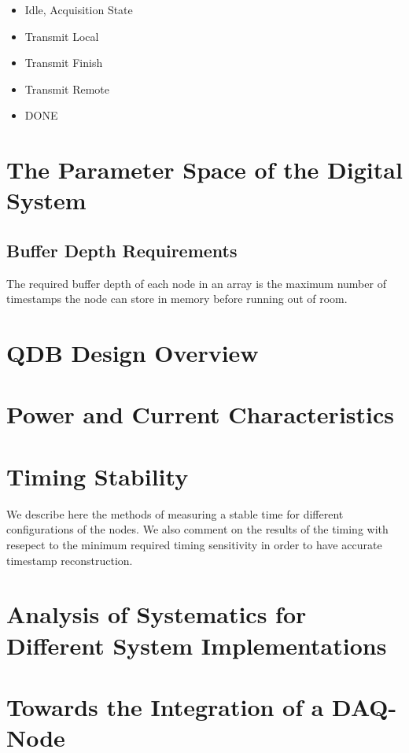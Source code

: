 \begin{itemize}
    \item Idle, Acquisition State
    \item Transmit Local
    \item Transmit Finish
    \item Transmit Remote
    \item DONE
\end{itemize}
\label{fsm_state_labels}

\section{The Parameter Space of the Digital System}


\subsection{Buffer Depth Requirements}

The required buffer depth of each node in an array is the maximum number of timestamps the node can store in memory before running out of room.

\section{QDB Design Overview}


\section{Power and Current Characteristics}



\section{Timing Stability}

We describe here the methods of measuring a stable time for different configurations of the nodes. 
We also comment on the results of the timing with resepect to the minimum required timing sensitivity in order to have accurate timestamp reconstruction.

\section{Analysis of Systematics for Different System Implementations}

\section{Towards the Integration of a DAQ-Node}

